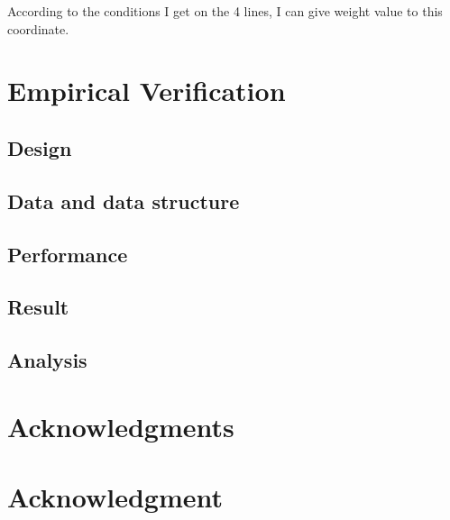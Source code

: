 \documentclass[conference,compsoc]{IEEEtran}
\begin{document}
  According to the conditions I get on the 4 lines, I can give weight value to this coordinate.

  


\section{Empirical Verification}


\subsection{Design}

\subsection{Data and data structure}

\subsection{Performance}

\subsection{Result}

\subsection{Analysis}



\ifCLASSOPTIONcompsoc
  \section*{Acknowledgments}
\else
  \section*{Acknowledgment}
\fi







\end{document}
